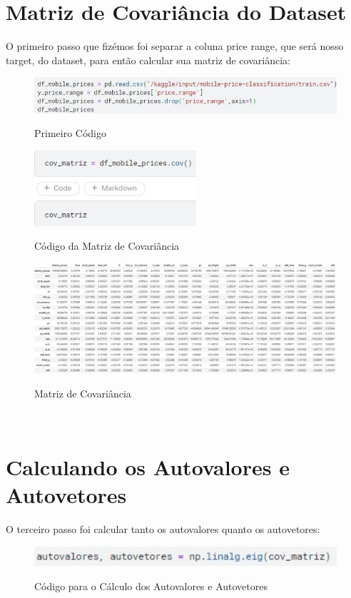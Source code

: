 \documentclass{report}
\begin{document}
\section{Matriz de Covariância do Dataset}
O primeiro passo que fizémos foi separar a coluna price range, que será nosso target, do dataset, para então calcular sua matriz de covariância:

\begin{figure}[H]
\caption{Primeiro Código}
\includegraphics[width=12cm]
{figures/primeiro_codigo.jpg}
\label{figura com o primeiro código que foi feito}
\end{figure}

\begin{figure}[H]
\centering
\caption{Código da Matriz de Covariância}
\includegraphics[width=6cm]
{figures/cod_matriz.jpg}
\label{figura com o código da matriz de covariância}
\end{figure}

\begin{figure}[H]
\centering
\caption{Matriz de Covariância}
\includegraphics[width=13cm]
{figures/matriz_cov.jpg}
\label{figura com a matriz de covariância}
\end{figure}
\
\section{Calculando os Autovalores e Autovetores}
O terceiro passo foi calcular tanto os autovalores quanto os autovetores:

\begin{figure}[H]
\centering
\caption{Código para o Cálculo dos Autovalores e Autovetores}
\includegraphics[width=12cm]
{figures/cod_autos.jpg}
\label{figura com o código dos autovalores e autovetores}
\end{figure}
\end{document}
